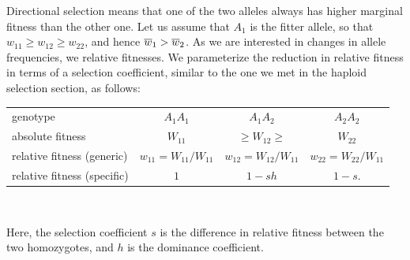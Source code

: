 Directional selection means that one of the two alleles always has higher marginal fitness than the other one. Let us assume that $A_1$ is the fitter allele, so that $w_{11} \geq w_{12} \geq w_{22}$, and hence $\overline{w}_1 > \overline{w}_2$. As we are interested in changes in allele frequencies, we  relative fitnesses. We parameterize the reduction in relative fitness in terms of a selection coefficient, similar to the
one we met in the haploid selection section, as follows:\\
\begin{center}
\begin{tabular}{lccc}
genotype & $A_1A_1$ & $A_1A_2$ & $A_2A_2$ \\
absolute fitness & $W_{11}$ & $ \geq W_{12} \geq$ & $W_{22}$ \\
relative fitness (generic) & $w_{11} = W_{11}/W_{11}$ & $w_{12} = W_{12}/W_{11}$ & $w_{22} = W_{22}/W_{11}$ \\
relative fitness  (specific) & $1$ & $1-sh$ & $1-s$. \\
\end{tabular}\\
\end{center}
Here, the selection coefficient $s$ is the difference in relative
fitness between the two homozygotes, and $h$ is the
dominance coefficient. \\

